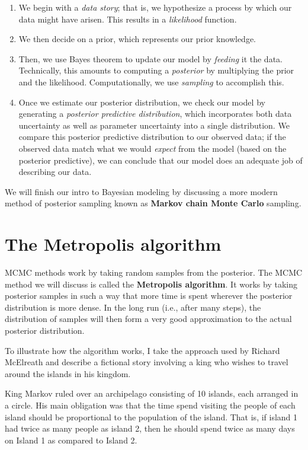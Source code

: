 \documentclass[11pt]{article}
\begin{document}
\begin{enumerate}
\item We begin with a \emph{data story}; that is, we hypothesize a process by which our data might have arisen.  This results in a \emph{likelihood} function.
\item We then decide on a prior, which represents our prior knowledge.
\item Then, we use Bayes theorem to update our model by \emph{feeding} it the data. Technically, this amounts to computing a \emph{posterior} by multiplying the prior and the likelihood.  Computationally, we use \emph{sampling} to accomplish this.
\item Once we estimate our posterior distribution, we check our model by generating a \emph{posterior predictive distribution}, which incorporates both data uncertainty as well as parameter uncertainty into a single distribution.  We compare this posterior predictive distribution to our observed data; if the observed data match what we would \emph{expect} from the model (based on the posterior predictive), we can conclude that our model does an adequate job of describing our data.
\end{enumerate}

We will finish our intro to Bayesian modeling by discussing a more modern method of posterior sampling known as \textbf{Markov chain Monte Carlo} sampling.

\section*{The Metropolis algorithm}
\label{sec-3}

MCMC methods work by taking random samples from the posterior.  The MCMC method we will discuss is called the \textbf{Metropolis algorithm}.  It works by taking posterior samples in such a way that more time is spent wherever the posterior distribution is more dense.  In the long run (i.e., after many steps), the distribution of samples will then form a very good approximation to the actual posterior distribution.

To illustrate how the algorithm works, I take the approach used by Richard McElreath and describe a fictional story involving a king who wishes to travel around the islands in his kingdom.

King Markov ruled over an archipelago consisting of 10 islands, each arranged in a circle.  His main obligation was that the time spend visiting the people of each island should be proportional to the population of the island.  That is, if island 1 had twice as many people as island 2, then he should spend twice as many days on Island 1 as compared to Island 2.
\end{document}
